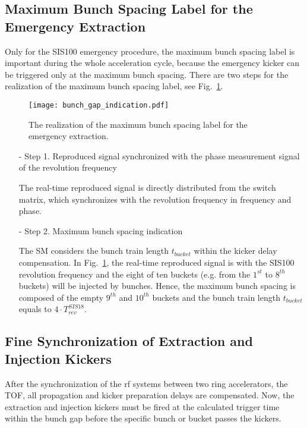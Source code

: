 \subsection{Maximum Bunch Spacing Label for the Emergency Extraction}

Only for the SIS100 emergency procedure, the maximum bunch spacing label is important during the whole acceleration cycle, because the emergency kicker can be triggered only at the maximum bunch spacing. There are two steps for the realization of the maximum bunch spacing label, see Fig.~\ref{Emergency_label}.
\begin{figure}[!htb]
   \centering   
   \texttt{[image: bunch\_gap\_indication.pdf]}
   \caption{The realization of the maximum bunch spacing label for the emergency extraction.}
   \label{Emergency_label}
\end{figure} 

\begin{itemize}
\item[-] Step 1. Reproduced signal synchronized with the phase measurement signal of the revolution frequency

The real-time reproduced signal is directly distributed from the switch matrix, which synchronizes with the revolution frequency in frequency and phase.
\item[-] Step 2. Maximum bunch spacing indication

The SM considers the bunch train length $t_{\mathit{bucket}}$ within the kicker delay compensation. In Fig.~\ref{Emergency_label}, the real-time reproduced signal is with the SIS100 revolution frequency and the eight of ten buckets (e.g. from the $1^{st}$ to $8^{th}$ buckets) will be injected by bunches. Hence, the maximum bunch spacing is composed of the empty $9^{th}$ and $10^{th}$ buckets and the bunch train length $t_{\mathit{bucket}}$ equals to $4\cdot T_{\mathit{rev}}^{\mathit{SIS18}}$.

\end{itemize}



\subsection{Fine Synchronization of Extraction and Injection Kickers}
After the synchronization of the rf systems between two ring accelerators, the TOF, all propagation and kicker preparation delays are compensated. Now, the extraction and injection kickers must be fired at the calculated trigger time within the bunch gap before the specific bunch or bucket passes the kickers.
 
